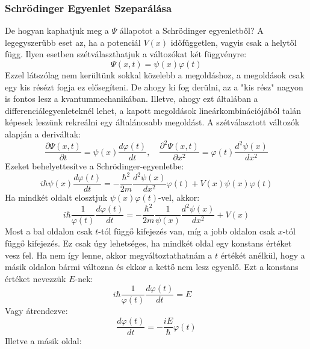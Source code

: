 \documentclass[../main.tex]{subfiles}
\begin{document}
\subsubsection{Schrödinger Egyenlet Szeparálása}
De hogyan kaphatjuk meg a $\Psi$ állapotot a Schrödinger egyenletből? A legegyszerűbb eset az, ha a potenciál $V(x)$ időfüggetlen, vagyis csak a helytől függ. Ilyen esetben szétválaszthatjuk a változókat két függvényre:
\begin{equation}
    \Psi(x,t) = \psi(x) \varphi(t)
\end{equation}
Ezzel látszólag nem kerültünk sokkal közelebb a megoldáshoz, a megoldások csak egy kis résézt fogja ez elősegíteni. De ahogy ki fog derülni, az a "kis rész" nagyon is fontos lesz a kvantummechanikában.
Illetve, ahogy ezt általában a differenciálegyenleteknél lehet, a kapott megoldások lineárkombinációjából talán képesek leszünk rekreálni egy általánosabb megoldást.
A szétválasztott változók alapján a deriváltak:
\begin{equation}
    \frac{\partial \Psi(x,t)}{\partial t} = \psi(x) \frac{d \varphi(t)}{dt}, \quad \frac{\partial^2 \Psi(x,t)}{\partial x^2} = \varphi(t) \frac{d^2 \psi(x)}{dx^2}
\end{equation}
Ezeket behelyettesítve a Schrödinger-egyenletbe:
\begin{equation}
    i \hbar \psi(x) \frac{d \varphi(t)}{dt} = -\frac{\hbar^2}{2m} \frac{d^2 \psi(x)}{dx^2} \varphi(t) + V(x) \psi(x) \varphi(t)
\end{equation}
Ha mindkét oldalt elosztjuk $\psi(x) \varphi(t)$-vel, akkor:
\begin{equation}
    i \hbar \frac{1}{\varphi(t)} \frac{d \varphi(t)}{dt} = -\frac{\hbar^2}{2m} \frac{1}{\psi(x)} \frac{d^2 \psi(x)}{dx^2} + V(x)
\end{equation}
Most a bal oldalon csak $t$-tól függő kifejezés van, míg a jobb oldalon csak $x$-tól függő kifejezés. Ez csak úgy lehetséges, ha mindkét oldal egy konstans értéket vesz fel. Ha nem így lenne,
akkor megváltoztathatnám a $t$ értékét anélkül, hogy a másik oldalon bármi változna és ekkor a kettő nem lesz egyenlő. Ezt a konstans értéket nevezzük $E$-nek:
\begin{equation}
    i \hbar \frac{1}{\varphi(t)} \frac{d \varphi(t)}{dt} = E \quad
\end{equation}
Vagy átrendezve:
\begin{equation}
    \frac{d \varphi(t)}{dt} = -\frac{i E}{\hbar} \varphi(t)
\end{equation}
Illetve a másik oldal:
\end{document}
